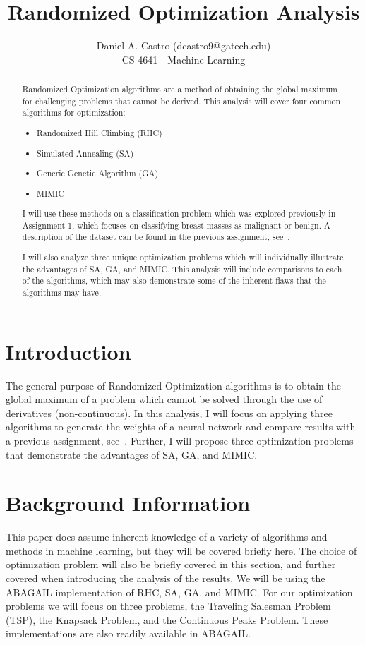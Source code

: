 \documentclass[annual]{acmsiggraph}
\title{Randomized Optimization Analysis}
\author{Daniel A. Castro (dcastro9@gatech.edu) \\ CS-4641 - Machine Learning}
\begin{document}
\maketitle

\begin{abstract}

Randomized Optimization algorithms are a method of obtaining the global maximum
for challenging problems that cannot be derived. This analysis will cover four common
algorithms for optimization:
\begin{itemize}
\item Randomized Hill Climbing (RHC)
\item Simulated Annealing (SA)~\cite{kirkpatrick1984optimization}
\item Generic Genetic Algorithm (GA)~\cite{fraser1957simulation}
\item MIMIC~\cite{de1997mimic}
\end{itemize}
I will use these methods on a classification problem which was explored previously in Assignment 1, 
which focuses on classifying breast masses as malignant or benign. A description of the dataset 
can be found in the previous assignment, see~\cite{Castro:2013}.

I will also analyze three unique optimization problems which will individually illustrate
the advantages of SA, GA, and MIMIC. This analysis will include comparisons to each of the
algorithms, which may also demonstrate some of the inherent flaws that the algorithms
may have. 

\end{abstract}

\section{Introduction}
The general purpose of Randomized Optimization algorithms is to obtain the global maximum
of a problem which cannot be solved through the use of derivatives (non-continuous). In this
analysis, I will focus on applying three algorithms to generate the weights of a neural network
and compare results with a previous assignment, see~\cite{Castro:2013}. Further, I will propose
three optimization problems that demonstrate the advantages of SA, GA, and MIMIC.
\section{Background Information}
This paper does assume inherent knowledge of a variety of algorithms and methods in machine
learning, but they will be covered briefly here. The choice of optimization problem will also
be briefly covered in this section, and further covered when introducing the analysis of the
results. We will be using the ABAGAIL implementation of RHC, SA, GA, and MIMIC. For our optimization
problems we will focus on three problems, the Traveling Salesman Problem (TSP), the Knapsack Problem,
and the Continuous Peaks Problem. These implementations are also readily available in ABAGAIL.
\end{document}
